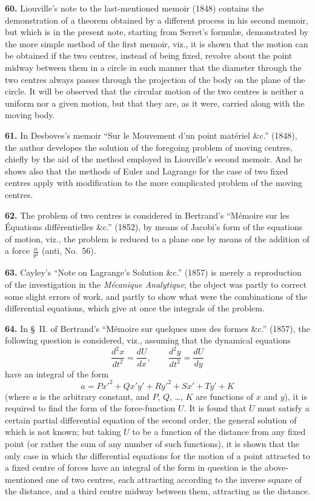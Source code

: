 \documentclass[11pt,a4paper]{article}
\theoremstyle{definition}
\begin{document}
\textbf{60.} Liouville's note to the last-mentioned memoir (1848) contains the demonstration of a theorem obtained by a different process in his second memoir, but which is in the present note, starting from Serret's formul\ae, demonstrated by the more simple method of the first memoir, viz., it is shown that the motion can be obtained if the two centres, instead of being fixed, revolve about the point midway between them in a circle in such manner that the diameter through the two centres always passes through the projection of the body on the plane of the circle. It will be observed that the circular motion of the two centres is neither a uniform nor a given motion, but that they are, as it were, carried along with the moving body.

\textbf{61.} In Desboves's memoir ``Sur le Mouvement d'un point mat\'eriel \&c.'' (1848), the author developes the solution of the foregoing problem of moving centres, chiefly by the aid of the method employed in Liouville's second memoir. And he shows also that the methods of Euler and Lagrange for the case of two fixed centres apply with modification to the more complicated problem of the moving centres.

\textbf{62.} The problem of two centres is considered in Bertrand's ``M\'emoire sur les \'Equations diff\'erentielles \&c.'' (1852), by means of Jacobi's form of the equations of motion, viz., the problem is reduced to a plane one by means of the addition of a force $\frac{\alpha}{y^2}$ (anti, No.~56).

\textbf{63.} Cayley's ``Note on Lagrange's Solution \&c.'' (1857) is merely a reproduction of the investigation in the \textit{M\'ecanique Analytique}; the object was partly to correct some slight errors of work, and partly to show what were the combinations of the differential equations, which give at once the integrals of the problem.

\textbf{64.} In \S~II. of Bertrand's ``M\'emoire sur quelques unes des formes \&c.'' (1857), the following question is considered, viz., assuming that the dynamical equations
\[
\frac{d^2x}{dt^2} = \frac{dU}{dx}, \qquad \frac{d^2y}{dt^2} = \frac{dU}{dy}
\]
have an integral of the form
\[
a = Px'^2 + Qx'y' + Ry'^2 + Sx' + Ty' + K
\]
(where $a$ is the arbitrary constant, and $P$, $Q$, \dots, $K$ are functions of $x$ and $y$), it is required to find the form of the force-function $U$. It is found that $U$ must satisfy a certain partial differential equation of the second order, the general solution of which is not known; but taking $U$ to be a function of the distance from any fixed point (or rather the sum of any number of such functions), it is shown that the only case in which the differential equations for the motion of a point attracted to a fixed centre of forces have an integral of the form in question is the above-mentioned one of two centres, each attracting according to the inverse square of the distance, and a third centre midway between them, attracting as the distance.
\end{document}
